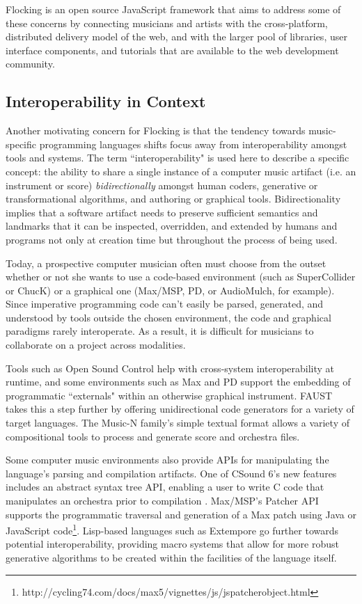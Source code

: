 \documentclass{article}
\begin{document}
Flocking is an open source JavaScript framework that aims to address some of these concerns by connecting musicians and artists with the cross-platform, distributed delivery model of the web, and with the larger pool of libraries, user interface components, and tutorials that are available to the web development community.

\subsection{Interoperability in Context}

Another motivating concern for Flocking is that the tendency towards music-specific programming languages shifts focus away from interoperability amongst tools and systems. The term ``interoperability" is used here to describe a specific concept: the ability to share a single instance of a computer music artifact (i.e. an instrument or score) {\it bidirectionally} amongst human coders, generative or transformational algorithms, and authoring or graphical tools. Bidirectionality implies that a software artifact needs to preserve sufficient semantics and landmarks that it can be inspected, overridden, and extended by humans and programs not only at creation time but throughout the process of being used.

Today, a prospective computer musician often must choose from the outset whether or not she wants to use a code-based environment (such as SuperCollider or ChucK) or a graphical one (Max/MSP, PD, or AudioMulch, for example). Since imperative programming code can't easily be parsed, generated, and understood by tools outside the chosen environment, the code and graphical paradigms rarely interoperate. As a result, it is difficult for musicians to collaborate on a project across modalities.

Tools such as Open Sound Control \cite{wright1997open} help with cross-system interoperability at runtime, and some environments such as Max and PD support the embedding of programmatic ``externals" within an otherwise graphical instrument. FAUST takes this a step further by offering unidirectional code generators for a variety of target languages. The Music-N family's simple textual format allows a variety of compositional tools to process and generate score and orchestra files.

Some computer music environments also provide APIs for manipulating the language's parsing and compilation artifacts. One of CSound 6's new features includes an abstract syntax tree API, enabling a user to write C code that manipulates an orchestra prior to compilation \cite{fitch2013Csound6}. Max/MSP's Patcher API supports the programmatic traversal and generation of a Max patch using Java or JavaScript code\footnote{http://cycling74.com/docs/max5/vignettes/js/jspatcherobject.html}. Lisp-based languages such as Extempore go further towards potential interoperability, providing macro systems that allow for more robust generative algorithms to be created within the facilities of the language itself.
\end{document}

